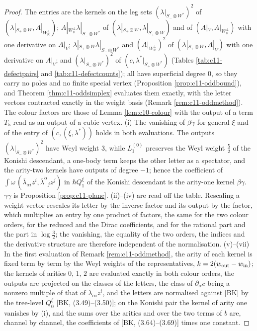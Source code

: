 \begin{proof}
The entries are the kernels on the leg sets $(\lambda|_{S_-\otimes W^*})^2$ of $(\lambda|_{S_+\otimes W},A|_{W_{\mathbb R}^\perp})$; $A|_{W_{\mathbb R}^\perp}\lambda|_{S_-\otimes W^*}$ of $(\lambda|_{S_+\otimes W},\lambda|_{S_+\otimes W})$ and of $(A|_V,A|_{W_{\mathbb R}^\perp})$ with one derivative on $A|_V$; $\lambda|_{S_+\otimes W}\lambda|_{S_-\otimes W^*}$ and $(A|_{W_{\mathbb R}^\perp})^2$ of $(\lambda|_{S_+\otimes W},A|_V)$ with one derivative on $A|_V$; and $(\lambda|_{S_-\otimes W^*})^2$ of $(c,\lambda^*|_{S_+\otimes W^*})$ (Tables \ref{tab:c11-defectpairs} and \ref{tab:c11-defectcounts}); all have superficial degree $0$, so they carry no poles and no finite special vertex (Proposition \ref{prop:c11-oddbound}), and Theorem \ref{thm:c11-oddsimplex} evaluates them exactly, with the letter vectors contracted exactly in the weight basis (Remark \ref{rem:c11-oddmethod}). The colour factors are those of Lemma \ref{lem:c10-colour} with the output of a term $T_5$ read as an output of a cubic vertex. (i) The vanishing of $\beta\gamma$ for general $\xi$ and of the entry of $(c,(\xi,\lambda^*))$ holds in both evaluations. The outputs $(\lambda|_{S_-\otimes W^*})^2$ have Weyl weight $3$, while $L_1^{(0)}$ preserves the Weyl weight $\tfrac52$ of the Konishi descendant, a one-body term keeps the other letter as a spectator, and the arity-two kernels have outputs of degree $-1$; hence the coefficient of $\int\omega\,(\bar\lambda_{\dot\alpha i}z^i,\bar\lambda^{\dot\alpha}{}_jz^j)$ in $\hbar Q^\xi_1$ of the Konishi descendant is the arity-one kernel $\beta\gamma$. $\gamma\gamma$ is Proposition \ref{prop:c11-plane}. (ii)--(iv) are read off the table. Rescaling a weight vector rescales its letter by the inverse factor and its output by the factor, which multiplies an entry by one product of factors, the same for the two colour orders, for the reduced and the Dirac coefficients, and for the rational part and the part in $\log\tfrac32$; the vanishing, the equality of the two orders, the indices and the derivative structure are therefore independent of the normalisation. (v)--(vii) In the first evaluation of Remark \ref{rem:c11-oddmethod}, the arity of each kernel is fixed term by term by the Weyl weights of the representatives, $k=2(w_{\rm out}-w_{\rm in})$; the kernels of arities $0$, $1$, $2$ are evaluated exactly in both colour orders, the outputs are projected on the classes of the letters, the class of $\partial_{\dot\alpha}c$ being a nonzero multiple of that of $\bar\lambda_{\dot\alpha i}z^i$, and the letters are normalised against [BK] by the tree-level $Q^\xi_0$ [BK, (3.49)--(3.50)]; on the Konishi pair the kernel of arity one vanishes by (i), and the sums over the arities and over the two terms of $b$ are, channel by channel, the coefficients of [BK, (3.64)--(3.69)] times one constant.
\end{proof}

